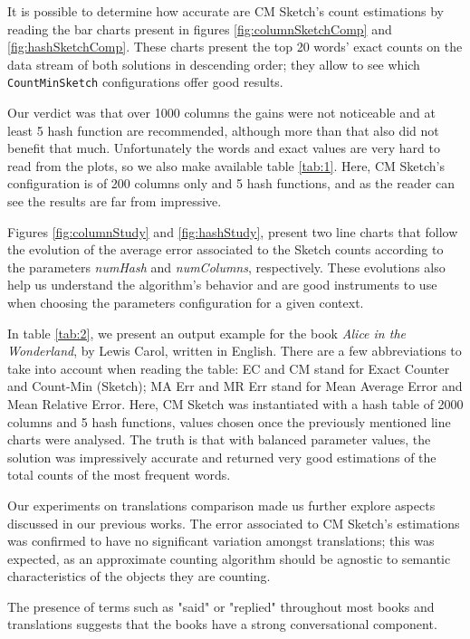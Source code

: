 \documentclass[shortpaper]{revdetua}
\begin{document}
It is possible to determine how accurate are CM Sketch's count estimations by reading the bar charts present in figures \ref{fig:columnSketchComp} and \ref{fig:hashSketchComp}.
These charts present the top 20 words' exact counts on the data stream of both solutions in descending order; 
they allow to see which \texttt{CountMinSketch} configurations offer good results.

Our verdict was that over 1000 columns the gains were not noticeable and at least 5 hash function are recommended, although more than that also did not benefit that much.
Unfortunately the words and exact values are very hard to read from the plots, so we also make available table \ref{tab:1}.
Here, CM Sketch's configuration is of 200 columns only and 5 hash functions, and as the reader can see the results are far from impressive.

Figures \ref{fig:columnStudy} and \ref{fig:hashStudy}, present two line charts that follow the evolution of the average error associated to the Sketch counts 
according to the parameters \textit{numHash} and \textit{numColumns}, respectively.
These evolutions also help us understand the algorithm's behavior and are good instruments to use when choosing the parameters configuration for a given context.

In table \ref{tab:2}, we present an output example for the book \textit{Alice in the Wonderland}, by Lewis Carol, written in English.
There are a few abbreviations to take into account when reading the table: EC and CM stand for Exact Counter and Count-Min (Sketch); MA Err and MR Err stand for 
Mean Average Error and Mean Relative Error.
Here, CM Sketch was instantiated with a hash table of 2000 columns and 5 hash functions, values chosen once the previously mentioned line charts were analysed.
The truth is that with balanced parameter values, the solution was impressively accurate and returned very good estimations of the total counts of the most frequent words.
\newline

Our experiments on translations comparison made us further explore aspects discussed in our previous works.
The error associated to CM Sketch's estimations was confirmed to have no significant variation amongst translations; 
this was expected, as an approximate counting algorithm should be agnostic to semantic characteristics of the objects they are counting.

The presence of terms such as "said" or "replied" throughout most books and translations suggests that the books have a strong conversational component.
\end{document}
